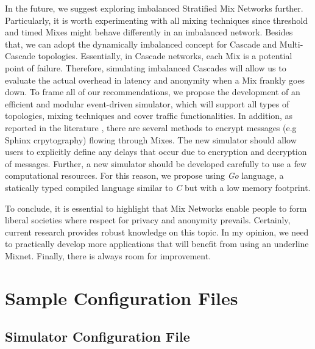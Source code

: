 \documentclass[logo,msc,cyber]{infthesis}   %
\begin{document}
In the future, we suggest exploring imbalanced Stratified Mix Networks further.
Particularly, it is worth experimenting with all mixing techniques since
threshold and timed Mixes might behave differently in an imbalanced network.
Besides that, we can adopt the dynamically imbalanced concept for Cascade and
Multi-Cascade topologies. Essentially, in Cascade networks, each Mix is a
potential point of failure. Therefore,  simulating imbalanced Cascades will
allow us to evaluate the actual overhead in latency and anonymity when a Mix
frankly goes down. To frame all of our recommendations, we propose the
development of an efficient and modular event-driven simulator, which will
support all types of topologies, mixing techniques and cover traffic
functionalities. In addition, as reported in the literature
\cite{KatzMixnet,chaum1981untraceable}, there are several methods to encrypt
messages (e.g Sphinx crpytography) flowing through Mixes. The new simulator
should allow users to explicitly define any delays that occur due to encryption
and decryption of messages. Further, a new simulator should be developed
carefully to use a few computational resources. For this reason, we propose
using \emph{Go} language, a statically typed compiled language similar to
\emph{C} but with a low memory footprint.

To conclude, it is essential to highlight that Mix Networks enable people to form
liberal societies where respect for privacy and anonymity prevails. Certainly,
current research provides robust knowledge on this topic. In my opinion, we need
to practically develop more applications that will benefit from using an
underline Mixnet. Finally, there is always room for improvement.





\appendix

\chapter{Sample Configuration Files}

\section{Simulator Configuration File}
\label{appendix:a1}
\end{document}

